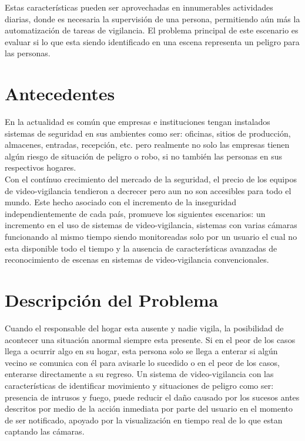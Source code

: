 Estas características pueden ser aprovechadas en innumerables actividades diarias, donde es necesaria la supervisión de una persona, permitiendo aún más la automatización de tareas de vigilancia. El problema principal de este escenario es evaluar si lo que esta siendo identificado en una escena representa un peligro para las personas.\\

\section{Antecedentes}
En la actualidad es común que empresas e instituciones tengan instalados sistemas de seguridad en sus ambientes como ser: oficinas, sitios de producción, almacenes, entradas, recepción, etc. pero realmente no solo las empresas tienen algún riesgo de situación de peligro o robo, si no también las personas en sus respectivos hogares.\\

Con el contínuo crecimiento del mercado de la seguridad, el precio de los equipos de video-vigilancia tendieron a decrecer pero aun no son accesibles para todo el mundo. Este hecho asociado con el incremento de la inseguridad independientemente de cada país, promueve los siguientes escenarios: un incremento en el uso de sistemas de video-vigilancia, sistemas con varias cámaras funcionando al mismo tiempo siendo monitoreadas solo por un usuario el cual no esta disponible todo el tiempo y la ausencia de características avanzadas de reconocimiento de escenas en sistemas de video-vigilancia convencionales.\

\section{Descripción del Problema}
Cuando el responsable del hogar esta ausente y nadie vigila, la posibilidad de acontecer una situación anormal siempre esta presente. Si en el peor de los casos llega a ocurrir algo en su hogar, esta persona solo se llega a enterar si algún vecino se comunica con él para avisarle lo sucedido o en el peor de los casos, enterarse directamente a su regreso. Un sistema de video-vigilancia con las características de identificar movimiento y situaciones de peligro como ser: presencia de intrusos y fuego, puede reducir el daño causado por los sucesos antes descritos por medio de la acción inmediata por parte del usuario en el momento de ser notificado, apoyado por la visualización en tiempo real de lo que estan captando las cámaras.\\

